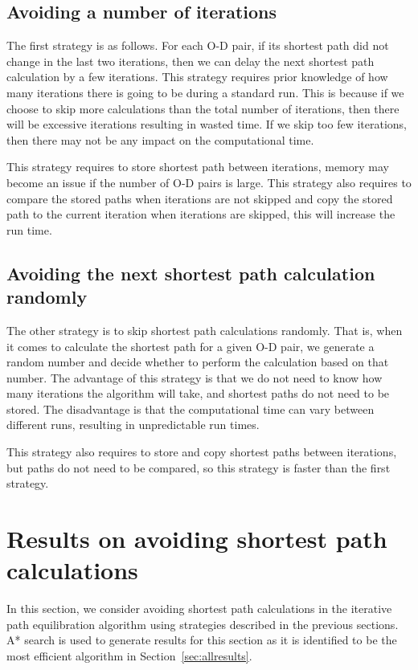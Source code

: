 \subsection{Avoiding a number of iterations}
The first strategy is as follows.
For each O-D pair,
if its shortest path did not change in the last two iterations,
then we can delay the next shortest path calculation by a few iterations.
This strategy requires prior knowledge of how many iterations there is going to be during a standard run.
This is because if we choose to skip more calculations than the total number of iterations,
then there will be excessive iterations resulting in wasted time.
If we skip too few iterations,
then there may not be any impact on the computational time.

This strategy requires to store shortest path between iterations,
memory may become an issue if the number of O-D pairs is large.
This strategy also requires to compare the stored paths when iterations are not skipped and  copy the stored path to the current iteration when iterations are skipped,
this will increase the run time.

\subsection{Avoiding the next shortest path calculation randomly}
The other strategy is to skip shortest path calculations randomly.
That is, when it comes to calculate the shortest path for a given O-D pair,
we generate a random number and decide whether to perform the calculation based on that number.
The advantage of this strategy is that we do not need to know how many iterations the algorithm will take,
and shortest paths do not need to be stored.
The disadvantage is that the computational time can vary between different runs,
resulting in unpredictable run times.

This strategy also requires to store and copy shortest paths between iterations,
but paths do not need to be compared, so this strategy is faster than the first strategy.

\section{Results on avoiding shortest path calculations}
In this section, we consider avoiding shortest path calculations in the iterative path equilibration algorithm using strategies described in the previous sections.
A* search is used to generate results for this section as it is identified to be the most efficient algorithm in Section~\ref{sec:allresults}.

